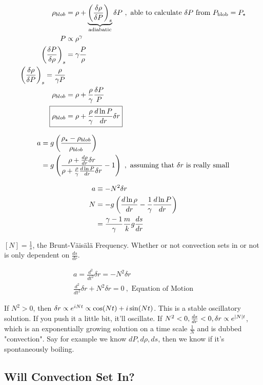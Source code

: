\begin{align}
\rho_{blob} &= \rho + \underbrace{\lp \frac{\delta \rho}{\delta P} \rp_s}_{\text{adiabatic}} \delta P~, \text{ able to calculate $\delta P$ from $P_{\text{blob}} = P_\star$}\\
P &\pt \rho^\gamma\\
\lp \frac{\delta P}{\delta \rho} \rp_s &= \gamma \frac{P}{\rho}\\
\lp \frac{\delta \rho}{\delta P}\rp_s = \frac{\rho}{\gamma P}\\
\rho_{blob} &= \rho + \frac{\rho}{\gamma}\frac{\delta P}{P}\\
\Aboxed{\rho_{blob} &= \rho + \frac{\rho}{\gamma} \frac{d \ln P}{dr} \delta r}
\end{align}

\begin{align}
a &= g  \left( \frac{\rho_\star - \rho_{blob}}{\rho_{blob}} \right)\\
&= g \left( \frac{\rho + \frac{d\rho}{dr} \delta r}{\rho + \frac{\rho}{\gamma} \frac{d \ln P}{dr}\delta r} - 1 \right)~,\text{ assuming that $\delta r$ is really small}
\end{align}

\begin{align}
a &\equiv -N^2\delta r\\
N &= -g \left( \frac{d \ln \rho}{dr} - \frac{1}{\gamma} \frac{d \ln P}{dr} \right)\\
&= \frac{\gamma -1}{\gamma} \frac{m}{k}g \frac{ds}{dr}
\end{align}

$[N] = \frac{1}{s}$, the Brunt-V\"ais\"al\"a Frequency. Whether or not convection sets in or not is only dependent on $\frac{ds}{dr}$. 

\begin{align}
a = \frac{d^2}{dt^2}\delta r = -N^2 \delta r\\
\boxed{\frac{d^2}{dt^2}\delta r + N^2 \delta r = 0}~,\text{ Equation of Motion}
\end{align}

If $N^2 > 0$, then $\delta r \propto e^{iNt} \propto  \cos(Nt)  + i\sin(Nt)$. This is a stable oscillatory solution. If you push it a little bit, it'll oscillate. If $N^2 < 0, \frac{ds}{dr} < 0, \delta r \propto e^{|N|t}$, which is an exponentially growing solution on a time scale $\frac{1}{N}$ and is dubbed "convection". Say for example we know $dP, d\rho, ds$, then we know if it's spontaneously boiling.\\

\subsection{Will Convection Set In?}

